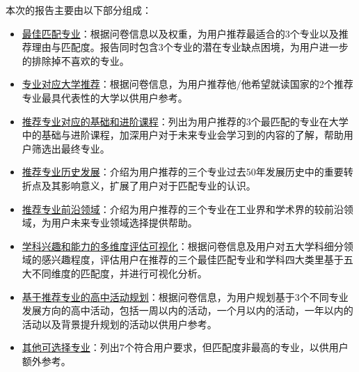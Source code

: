 \documentclass[12pt]{article}
\begin{document}
\begin{CJK*}{UTF8}{gbsn}
\begin{flushleft}
本次的报告主要由以下部分组成：
\begin{itemize} 
    \item \underline{最佳匹配专业}：根据问卷信息以及权重，为用户推荐最适合的3个专业以及推荐理由与匹配度。报告同时包含3个专业的潜在专业缺点困境，为用户进一步的排除掉不喜欢的专业。
    \item \underline{专业对应大学推荐}：根据问卷信息，为用户推荐他/他希望就读国家的2个推荐专业最具代表性的大学以供用户参考。
    \item \underline{推荐专业对应的基础和进阶课程}：列出为用户推荐的3个最匹配的专业在大学中的基础与进阶课程，加深用户对于未来专业会学习到的内容的了解，帮助用户筛选出最终专业。
    \item \underline{推荐专业历史发展}：介绍为用户推荐的三个专业过去50年发展历史中的重要转折点及其影响意义，扩展了用户对于匹配专业的认识。
    \item \underline{推荐专业前沿领域}：介绍为用户推荐的三个专业在工业界和学术界的较前沿领域，为用户未来专业领域选择提供帮助。
    \item \underline{学科兴趣和能力的多维度评估可视化}：根据问卷信息及用户对五大学科细分领域的感兴趣程度，评估用户在推荐的三个最佳匹配专业和学科四大类里基于五大不同维度的匹配度，并进行可视化分析。
    \item \underline{基于推荐专业的高中活动规划}：根据问卷信息，为用户规划基于3个不同专业发展方向的高中活动，包括一周以内的活动，一个月以内的活动，一年以内的活动以及背景提升规划的活动以供用户参考。
    \item \underline{其他可选择专业}：列出7个符合用户要求，但匹配度非最高的专业，以供用户额外参考。
\end{itemize}
\end{flushleft}
\hspace{0pt}
\vfill


\vspace{-2cm}

\newpage

\bigskip
\bigskip
\vfill

\vfill

\newpage

\end{CJK*}
\end{document}
